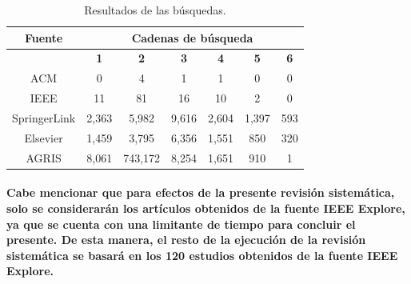 \documentclass[10pt, twocolumn]{article}
\begin{document}
\begin{table}[b]
\centering
\begin{tabular}{|c|c|c|c|c|c|c|}
\hline
\multicolumn{1}{|c|}{\textbf{Fuente}} & \multicolumn{6}{c|}{\textbf{Cadenas de búsqueda}}                                                                                                                                                         \\ \hline
                                      & \multicolumn{1}{c|}{\textbf{1}} & \multicolumn{1}{c|}{\textbf{2}} & \multicolumn{1}{c|}{\textbf{3}} & \multicolumn{1}{c|}{\textbf{4}} & \multicolumn{1}{c|}{\textbf{5}} & \multicolumn{1}{c|}{\textbf{6}} \\ \hline
ACM                                   & 0                              & 4                              & 1                              & 1                              & 0                              & 0                              \\ \hline
IEEE                                  & 11                              & 81                              & 16                              & 10                              & 2                              & 0                              \\ \hline
SpringerLink                          & 2,363                              & 5,982                              & 9,616                         	     & 2,604                              & 1,397                              & 593                              \\ \hline
Elsevier                              & 1,459                              & 3,795                              & 6,356                              & 1,551                              & 850                              & 320                              \\ \hline
AGRIS                                 & 8,061                              & 743,172                              & 8,254                              & 1,651                              & 910                              & 1                              \\ \hline
\end{tabular}
\caption{Resultados de las búsquedas.}
\label{tabla:busquedas}
\end{table}

\paragraph{Cabe mencionar que para efectos de la presente revisión sistemática, solo se considerarán los artículos obtenidos de la fuente IEEE Explore, ya que se cuenta con una limitante de tiempo para concluir el presente. De esta manera, el resto de la ejecución de la revisión sistemática se basará en los 120 estudios obtenidos de la fuente IEEE Explore.}
\end{document}
